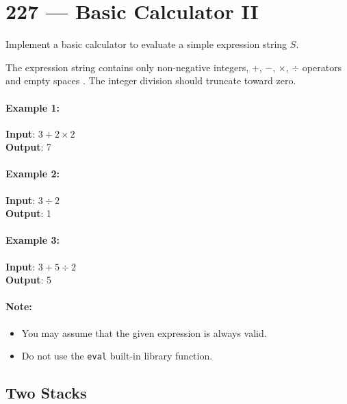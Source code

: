 \section{227 --- Basic Calculator II}
Implement a basic calculator to evaluate a simple expression string $S$.
\par
The expression string contains only non-negative integers, $+$, $-$, $\times$, $\div$ operators and empty spaces . The integer division should truncate toward zero.

\paragraph{Example 1:}

\begin{flushleft}
\textbf{Input}: $3+2\times2$
\\
\textbf{Output}: 7
\end{flushleft}

\paragraph{Example 2:}

\begin{flushleft}
\textbf{Input}: $ 3\div2 $
\\
\textbf{Output}: 1
\end{flushleft}

\paragraph{Example 3:}

\begin{flushleft}
\textbf{Input}:  $3+5\div2$
\\
\textbf{Output}: 5
\end{flushleft}

\paragraph{Note:}

\begin{itemize}
\item You may assume that the given expression is always valid.
\item Do not use the \texttt{eval} built-in library function.
\end{itemize}

\subsection{Two Stacks}

